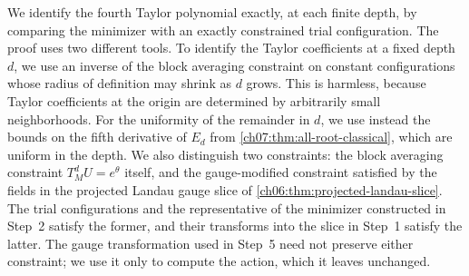 We identify the fourth Taylor polynomial exactly, at each finite depth, by comparing the minimizer with an exactly constrained trial configuration. The proof uses two different tools. To identify the Taylor coefficients at a fixed depth $d$, we use an inverse of the block averaging constraint on constant configurations whose radius of definition may shrink as $d$ grows. This is harmless, because Taylor coefficients at the origin are determined by arbitrarily small neighborhoods. For the uniformity of the remainder in $d$, we use instead the bounds on the fifth derivative of $E_d$ from \cref{ch07:thm:all-root-classical}, which are uniform in the depth. We also distinguish two constraints: the block averaging constraint $T_M^dU=e^\theta$ itself, and the gauge-modified constraint satisfied by the fields in the projected Landau gauge slice of \cref{ch06:thm:projected-landau-slice}. The trial configurations and the representative of the minimizer constructed in Step~2 satisfy the former, and their transforms into the slice in Step~1 satisfy the latter. The gauge transformation used in Step~5 need not preserve either constraint; we use it only to compute the action, which it leaves unchanged.

